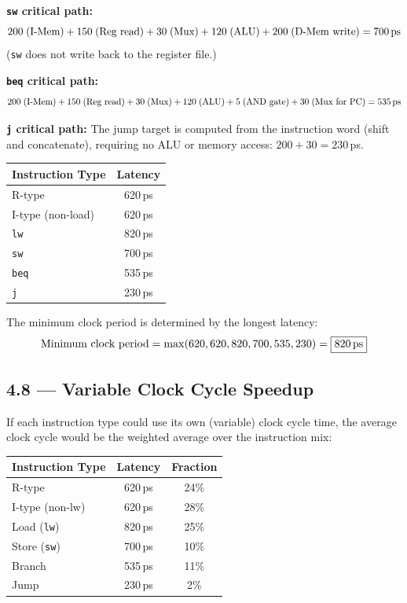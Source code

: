 \textbf{\texttt{sw} critical path:}
\[
  200\;(\text{I-Mem}) + 150\;(\text{Reg read}) + 30\;(\text{Mux}) +
  120\;(\text{ALU}) + 200\;(\text{D-Mem write}) = 700\text{\,ps}
\]
(\texttt{sw} does not write back to the register file.)

\textbf{\texttt{beq} critical path:}
\[
  200\;(\text{I-Mem}) + 150\;(\text{Reg read}) + 30\;(\text{Mux}) +
  120\;(\text{ALU}) + 5\;(\text{AND gate}) + 30\;(\text{Mux for PC})
  = 535\text{\,ps}
\]

\textbf{\texttt{j} critical path:}
The jump target is computed from the instruction word (shift and concatenate),
requiring no ALU or memory access:
$200 + 30 = 230$\,ps.

\medskip
\begin{center}
\begin{tabular}{lc}
\toprule
\textbf{Instruction Type} & \textbf{Latency} \\
\midrule
R-type      & 620\,ps \\
I-type (non-load) & 620\,ps \\
\texttt{lw} & 820\,ps \\
\texttt{sw} & 700\,ps \\
\texttt{beq} & 535\,ps \\
\texttt{j}  & 230\,ps \\
\bottomrule
\end{tabular}
\end{center}

The minimum clock period is determined by the longest latency:
\[
  \text{Minimum clock period} = \max(620, 620, 820, 700, 535, 230)
  = \boxed{820\text{\,ps}}
\]

\subsection*{4.8 --- Variable Clock Cycle Speedup}
\hypertarget{sol-4.8}{}

If each instruction type could use its own (variable) clock cycle time, the
average clock cycle would be the weighted average over the instruction mix:

\begin{center}
\begin{tabular}{lcc}
\toprule
\textbf{Instruction Type} & \textbf{Latency} & \textbf{Fraction} \\
\midrule
R-type            & 620\,ps & 24\% \\
I-type (non-lw)   & 620\,ps & 28\% \\
Load (\texttt{lw})& 820\,ps & 25\% \\
Store (\texttt{sw})& 700\,ps & 10\% \\
Branch            & 535\,ps & 11\% \\
Jump              & 230\,ps & 2\% \\
\bottomrule
\end{tabular}
\end{center}

